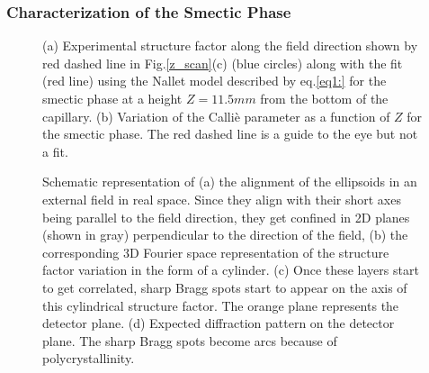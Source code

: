 \documentclass[aps,prl,preprint,superscriptaddress]{revtex4-1} %
\begin{document}
\subsubsection{Characterization of the Smectic Phase}
\begin{figure}[ht]
\caption{(a) Experimental structure factor along the field direction shown by red dashed line in Fig.\ref{z_scan}(c) (blue circles) along with the fit (red line) using the Nallet model described by eq.\ref{eq1:} for the smectic phase at a height $Z=11.5mm$ from the bottom of the capillary. (b) Variation of the Calli\`{e} parameter as a function of $Z$ for the smectic phase. The red dashed line is a guide to the eye but not a fit.}\label{callie}
\end{figure}
\begin{figure}[ht]
\caption{Schematic representation of (a) the alignment of the ellipsoids in an external field in real space. Since they align with their short axes being parallel to the field direction, they get confined in 2D planes (shown in gray) perpendicular to the direction of the field, (b) the corresponding 3D Fourier space representation of the structure factor variation in the form of a cylinder. (c) Once these layers start to get correlated, sharp Bragg spots start to appear on the axis of this cylindrical structure factor. The orange plane represents the detector plane. (d) Expected diffraction pattern on the detector plane. The sharp Bragg spots become arcs because of polycrystallinity.}\label{Fspace_smectic}
\end{figure} 
\end{document}

